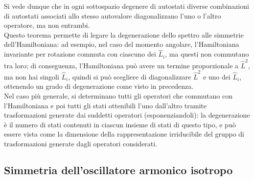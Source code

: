 Si vede dunque che in ogni sottospazio degenere di autostati diverse combinazioni di autostati associati allo stesso autovalore diagonalizzano l'uno o l'altro operatore, ma non entrambi.\\
Questo teorema permette di legare la degenerazione dello spettro alle simmetrie dell'Hamiltoniana: ad esempio, nel caso del momento angolare, l'Hamiltoniana invariante per rotazione commuta con ciascuno dei $ \hat{L}_i $, ma questi non commutano tra loro; di conseguenza, l'Hamiltoniana può avere un termine proporzionale a $ \hat{L}^2 $, ma non hai singoli $ \hat{L}_i $, quindi si può scegliere di diagonalizzare $ \hat{L}^2 $ e uno dei $ \hat{L}_i $, ottenendo un grado di degenerazione come visto in precedenza.\\
Nel caso più generale, si determinano tutti gli operatori che commutano con l'Hamiltoniana e poi tutti gli stati ottenibili l'uno dall'altro tramite trasformazioni generate dai suddetti operatori (esponenziandoli): la degenerazione è il numero di stati contenuti in ciascun insieme di stati di questo tipo, e può essere vista come la dimensione della rappresentazione irriducibile del gruppo di trasformazioni generate dagli operatori considerati.

\subsection{Simmetria dell'oscillatore armonico isotropo}

